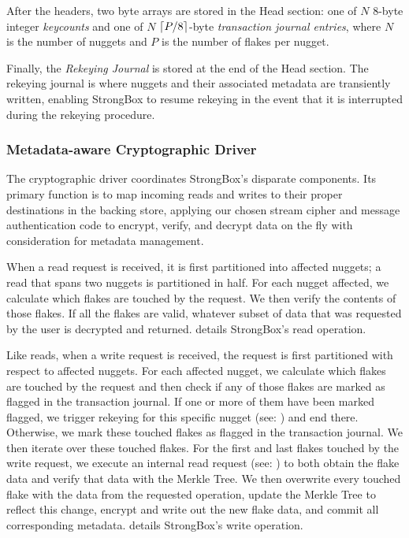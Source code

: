 After the headers, two byte arrays are stored in the Head section: one
of $N$ 8-byte integer \textit{keycounts} and one of $N$ $\lceil P /
  8 \rceil$-byte \textit{transaction journal entries}, where $N$ is the
number of nuggets and $P$ is the number of flakes per nugget.

Finally, the \emph{Rekeying Journal} is stored at the end of the Head section.
The rekeying journal is where nuggets and their associated metadata are
transiently written, enabling StrongBox to resume rekeying in the event that it
is interrupted during the rekeying procedure.

\subsubsection{Metadata-aware Cryptographic Driver}

The cryptographic driver coordinates StrongBox's disparate components.
Its primary function is to map incoming reads and writes to their
proper destinations in the backing store, applying our chosen stream
cipher and message authentication code to encrypt, verify, and decrypt
data on the fly with consideration for metadata management.

When a read request is received, it is first partitioned into affected
nuggets; \eg a read that spans two nuggets is partitioned in half.
For each nugget affected, we calculate which flakes are touched by the
request. We then verify the contents of those flakes. If all the
flakes are valid, whatever subset of data that was requested by the
user is decrypted and returned.  details StrongBox's
read operation.

Like reads, when a write request is received, the request is first
partitioned with respect to affected nuggets. For each affected
nugget, we calculate which flakes are touched by the request and then
check if any of those flakes are marked as flagged in the transaction
journal. If one or more of them have been marked flagged, we trigger
rekeying for this specific nugget (see: ) and end
there. Otherwise, we mark these touched flakes as flagged in the
transaction journal. We then iterate over these touched flakes. For
the first and last flakes touched by the write request, we execute an
internal read request (see: ) to both obtain the flake
data and verify that data with the Merkle Tree. We then overwrite
every touched flake with the data from the requested operation, update
the Merkle Tree to reflect this change, encrypt and write out the new
flake data, and commit all corresponding metadata. 
details StrongBox's write operation.

